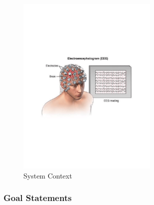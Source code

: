 \documentclass[12pt]{article}
\begin{document}

\begin{figure}[h!]
\begin{center}
 \includegraphics[width=0.6\textwidth]{EEG-recording}
\caption{System Context}
\label{Fig_SystemContext} 
\end{center}
\end{figure}


\newpage

\subsubsection{Goal Statements}

\end{document}
